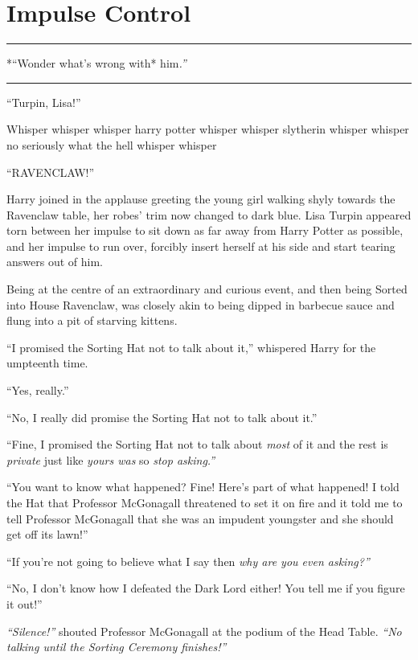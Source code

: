 \chapter{Impulse Control}

\begin{center}\rule{3in}{0.4pt}\end{center}

*``Wonder what's wrong with* him\emph{.''}

\begin{center}\rule{3in}{0.4pt}\end{center}

``Turpin, Lisa!''

Whisper whisper whisper harry potter whisper whisper slytherin whisper
whisper no seriously what the hell whisper whisper

``RAVENCLAW!''

Harry joined in the applause greeting the young girl walking shyly
towards the Ravenclaw table, her robes' trim now changed to dark blue.
Lisa Turpin appeared torn between her impulse to sit down as far away
from Harry Potter as possible, and her impulse to run over, forcibly
insert herself at his side and start tearing answers out of him.

Being at the centre of an extraordinary and curious event, and then
being Sorted into House Ravenclaw, was closely akin to being dipped in
barbecue sauce and flung into a pit of starving kittens.

``I promised the Sorting Hat not to talk about it,'' whispered Harry for
the umpteenth time.

``Yes, really.''

``No, I really did promise the Sorting Hat not to talk about it.''

``Fine, I promised the Sorting Hat not to talk about \emph{most} of it
and the rest is \emph{private} just like \emph{yours was} so \emph{stop
asking.''}

``You want to know what happened? Fine! Here's part of what happened! I
told the Hat that Professor McGonagall threatened to set it on fire and
it told me to tell Professor McGonagall that she was an impudent
youngster and she should get off its lawn!''

``If you're not going to believe what I say then \emph{why are you even
asking?''}

``No, I don't know how I defeated the Dark Lord either! You tell me if
you figure it out!''

\emph{``Silence!''} shouted Professor McGonagall at the podium of the
Head Table. \emph{``No talking until the Sorting Ceremony finishes!''}


